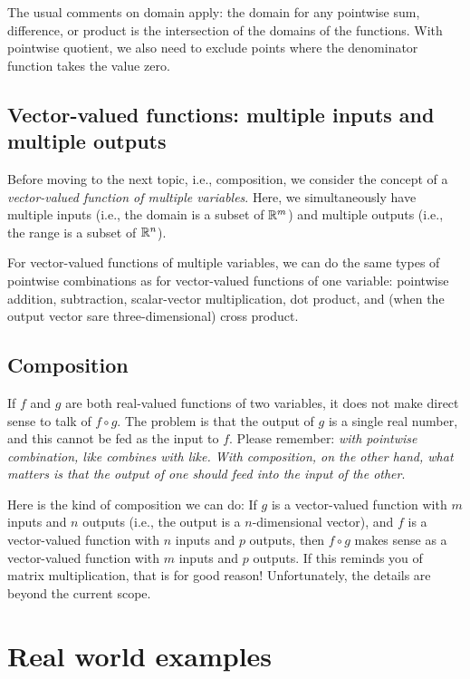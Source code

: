 \documentclass[10pt]{amsart}
\begin{document}
The usual comments on domain apply: the domain for any pointwise sum,
difference, or product is the intersection of the domains of the
functions. With pointwise quotient, we also need to exclude points
where the denominator function takes the value zero.

\subsection{Vector-valued functions: multiple inputs and multiple outputs}

Before moving to the next topic, i.e., composition, we consider the
concept of a {\em vector-valued function of multiple variables}. Here,
we simultaneously have multiple inputs (i.e., the domain is a subset
of $\mathbb{R}^m$) and multiple outputs (i.e., the range is a subset of
$\mathbb{R}^n$).

For vector-valued functions of multiple variables, we can do the same
types of pointwise combinations as for vector-valued functions of one
variable: pointwise addition, subtraction, scalar-vector
multiplication, dot product, and (when the output vector sare
three-dimensional) cross product.

\subsection{Composition}

If $f$ and $g$ are both real-valued functions of two variables, it
does not make direct sense to talk of $f \circ g$. The problem is that
the output of $g$ is a single real number, and this cannot be fed as
the input to $f$. Please remember: {\em with pointwise combination,
like combines with like. With composition, on the other hand, what
matters is that the output of one should feed into the input of the
other}.

Here is the kind of composition we can do: If $g$ is a vector-valued
function with $m$ inputs and $n$ outputs (i.e., the output is a
$n$-dimensional vector), and $f$ is a vector-valued function with $n$
inputs and $p$ outputs, then $f \circ g$ makes sense as a
vector-valued function with $m$ inputs and $p$ outputs. If this
reminds you of matrix multiplication, that is for good reason!
Unfortunately, the details are beyond the current scope.

\section{Real world examples}
\end{document}
